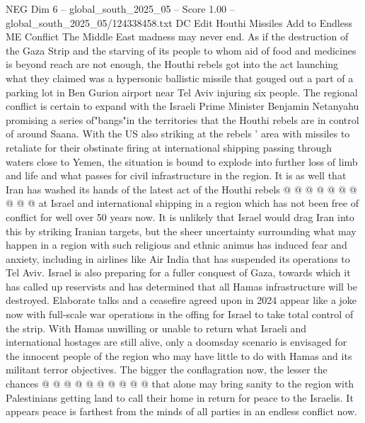 \begin{textsample}{NEG Dim 6 – global\_south\_2025\_05 – Score 1.00 – global\_south\_2025\_05/124338458.txt}  \label{ex:f6_neg_424}
DC Edit Houthi Missiles Add to Endless ME Conflict The Middle East madness may never end.
As if the destruction of the Gaza Strip and the starving of its people to whom aid of food and medicines is beyond reach are not enough, the Houthi rebels got into the act launching what they claimed was a hypersonic ballistic missile that gouged out a part of a parking lot in Ben Gurion airport near Tel Aviv injuring six people.
The regional conflict is certain to expand with the Israeli Prime Minister Benjamin Netanyahu promising a series of"bangs"in the territories that the Houthi rebels are in control of around Saana.
With the US also striking at the rebels ' area with missiles to retaliate for their obstinate firing at international shipping passing through waters close to Yemen, the situation is bound to explode into further loss of limb and life and what passes for civil infrastructure in the region.
It is as well that Iran has washed its hands of the latest act of the Houthi rebels @ @ @ @ @ @ @ @ @ @ at Israel and international shipping in a region which has not been free of conflict for well over 50 years now.
It is unlikely that Israel would drag Iran into this by striking Iranian targets, but the sheer uncertainty surrounding what may happen in a region with such religious and ethnic animus has induced fear and anxiety, including in airlines like Air India that has suspended its operations to Tel Aviv.
Israel is also preparing for a fuller conquest of Gaza, towards which it has called up reservists and has determined that all Hamas infrastructure will be destroyed.
Elaborate talks and a ceasefire agreed upon in 2024 appear like a joke now with full-scale war operations in the offing for Israel to take total control of the strip.
With Hamas unwilling or unable to return what Israeli and international hostages are still alive, only a doomsday scenario is envisaged for the innocent people of the region who may have little to do with Hamas and its militant terror objectives.
The bigger the conflagration now, the lesser the chances @ @ @ @ @ @ @ @ @ @ that alone may bring sanity to the region with Palestinians getting land to call their home in return for peace to the Israelis.
It appears peace is farthest from the minds of all parties in an endless conflict now.

\end{textsample}
